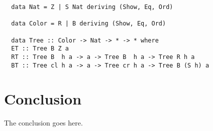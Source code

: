 \documentclass[journal]{../IEEEtemplate/IEEEtran}
\begin{document}
\begin{verbatim}
  data Nat = Z | S Nat deriving (Show, Eq, Ord)

  data Color = R | B deriving (Show, Eq, Ord)

  data Tree :: Color -> Nat -> * -> * where
  ET :: Tree B Z a
  RT :: Tree B  h a -> a -> Tree B  h a -> Tree R h a
  BT :: Tree cl h a -> a -> Tree cr h a -> Tree B (S h) a
\end{verbatim}


\section{Conclusion}
The conclusion goes here.






\appendices
\end{document}

